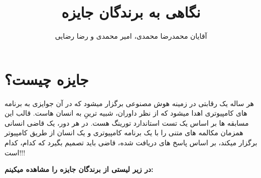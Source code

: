\documentclass[18pt,a4paper]{report}
\title{نگاهی به برندگان جایزه  \lr{Loebner}}
\author{ آقایان محمدرضا محمدی، امیر محمدی و رضا رضایی}
\begin{document}
	
 	\maketitle
 	\tableofcontents
 	
 	
 	\chapter{جایزه  چیست؟} 
 	هر ساله یک رقابتی در زمینه هوش مصنوعی برگزار میشود که در آن جوایزی به برنامه های کامپیوتری اهدا میشود که از نظر داوران،  شبیه ترینِ به انسان هاست. قالب این مسابقه ها بر اساس یک تست استاندارد تورینگ هست. در هر دور، یک قاضی انسانی همزمان مکالمه های متنی را با یک برنامه کامپیوتری و یک انسان از طریق کامپیوتر برگزار میکند، بر اساس پاسخ های دریافت شده، قاضی باید تصمیم بگیرد که کدام، کدام است!!!
 	
 	\large{\textbf{در زیر لیستی از برندگان جایزه   را مشاهده میکینم: }}
 	
\end{document}
